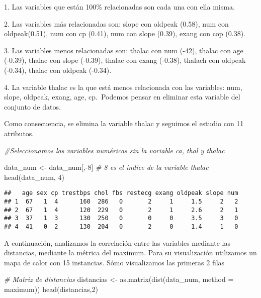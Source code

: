 \documentclass[
]{article}
\newenvironment{Shaded}{\begin{snugshade}}{\end{snugshade}}
\newcommand{\AttributeTok}[1]{\textcolor[rgb]{0.77,0.63,0.00}{#1}}
\newcommand{\CommentTok}[1]{\textcolor[rgb]{0.56,0.35,0.01}{\textit{#1}}}
\newcommand{\DecValTok}[1]{\textcolor[rgb]{0.00,0.00,0.81}{#1}}
\newcommand{\FunctionTok}[1]{\textcolor[rgb]{0.00,0.00,0.00}{#1}}
\newcommand{\NormalTok}[1]{#1}
\newcommand{\OtherTok}[1]{\textcolor[rgb]{0.56,0.35,0.01}{#1}}
\newcommand{\SpecialCharTok}[1]{\textcolor[rgb]{0.00,0.00,0.00}{#1}}
\newcommand{\StringTok}[1]{\textcolor[rgb]{0.31,0.60,0.02}{#1}}
\begin{document}
1. Las variables que están 100\% relacionadas son cada una con ella
misma.

2. Las variables más relacionadas son: slope con oldpeak (0.58), num con
oldpeak(0.51), num con cp (0.41), num con slope (0.39), exang con cop
(0.38).

3. Las variables menos relacionadas son: thalac con num (-42), thalac
con age (-0.39), thalac con slope (-0.39), thalac con exang (-0.38),
thalach con oldpeak (-0.34), thalac con oldpeak (-0.34).

4. La variable thalac es la que está menos relacionada con las
variables: num, slope, oldpeak, exang, age, cp.~Podemos pensar en
eliminar esta variable del conjunto de datos.

Como consecuencia, se elimina la variable thalac y seguimos el estudio
con 11 atributos.

\begin{Shaded}
\begin{Highlighting}[]
\CommentTok{\#Seleccionamos las variables numéricas sin la variable ca, thal y thalac}

\NormalTok{data\_num }\OtherTok{\textless{}{-}}\NormalTok{ data\_num[,}\SpecialCharTok{{-}}\DecValTok{8}\NormalTok{] }\CommentTok{\# 8 es el índice de la variable thalac}
\FunctionTok{head}\NormalTok{(data\_num, }\DecValTok{4}\NormalTok{)}
\end{Highlighting}
\end{Shaded}

\begin{verbatim}
##   age sex cp trestbps chol fbs restecg exang oldpeak slope num
## 1  67   1  4      160  286   0       2     1     1.5     2   2
## 2  67   1  4      120  229   0       2     1     2.6     2   1
## 3  37   1  3      130  250   0       0     0     3.5     3   0
## 4  41   0  2      130  204   0       2     0     1.4     1   0
\end{verbatim}

A continuación, analizamos la correlación entre las variables mediante
las distancias, mediante la métrica del maximum. Para su visualización
utilizamos un mapa de calor con 15 instancias. Sómo visualizamos las
primeras 2 filas

\begin{Shaded}
\begin{Highlighting}[]
\CommentTok{\# Matriz de distancias}
\NormalTok{distancias }\OtherTok{\textless{}{-}} \FunctionTok{as.matrix}\NormalTok{(}\FunctionTok{dist}\NormalTok{(data\_num, }\AttributeTok{method =} \StringTok{\textquotesingle{}maximum\textquotesingle{}}\NormalTok{))}
\FunctionTok{head}\NormalTok{(distancias,}\DecValTok{2}\NormalTok{)}
\end{Highlighting}
\end{Shaded}
\end{document}
